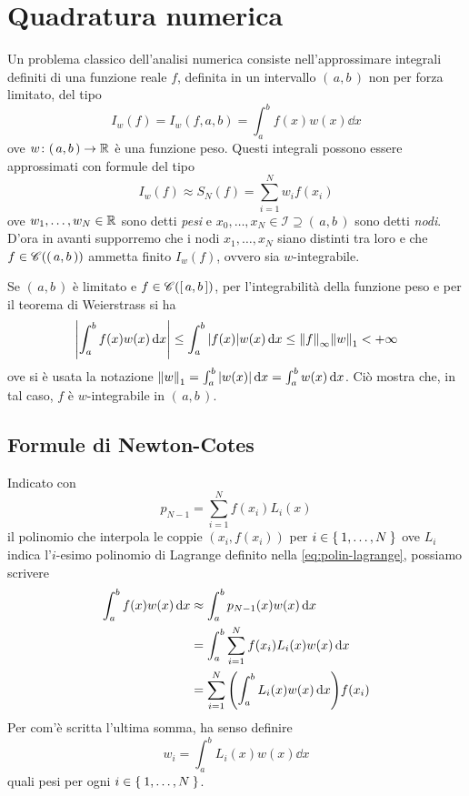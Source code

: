 \chapter{Quadratura numerica}

	\noindent Un problema classico dell'analisi numerica consiste nell'approssimare integrali definiti di una funzione reale \(f\), definita in un intervallo \((\, a, b \,)\) non per forza limitato, del tipo
	\begin{equation}\label{eq:integrale-con-peso}
		I_w (f) = I_w (f, a, b) = \int_a^b f (x) w (x) \dd{x}
	\end{equation}
	ove \(w \colon (\, a, b \,) \to \mathbb{R}\) è una funzione peso. Questi integrali possono essere approssimati con formule del tipo
	\begin{equation}\label{eq:formula-quadratura}
		I_w (f) \approx S_N (f) = \sum_{i = 1}^N w_i f (x_i)
	\end{equation}
	ove \(w_1, \dots, w_N \in \mathbb{R}\) sono detti \emph{pesi} e \(x_0, \dots, x_N \in \mathcal{I} \supseteq (\, a, b \,)\) sono detti \emph{nodi}. D'ora in avanti supporremo che i nodi \(x_1, \dots, x_N\) siano distinti tra loro e che \(f \in \mathscr{C} ((\, a, b \,))\) ammetta finito \(I_w (f)\), ovvero sia \(w\)-integrabile.
	
	Se \((\, a, b \,)\) è limitato e \(f \in \mathscr{C} ([\, a, b \,])\), per l'integrabilità della funzione peso e per il teorema di Weierstrass si ha
	\begin{equation*}
		\abs{\int_a^b f (x) w (x) \dd{x}} \le \int_a^b \abs{f (x)} w (x) \dd{x} \le \norm{f}_\infty \norm{w}_1 < + \infty
	\end{equation*}
	ove si è usata la notazione \(\norm{w}_1 = \int_a^b \abs{w (x)} \dd{x} = \int_a^b w (x) \dd{x}\). Ciò mostra che, in tal caso, \(f\) è \(w\)-integrabile in \((\, a, b \,)\).
	
\section{Formule di Newton-Cotes}
	
	\noindent Indicato con
	\begin{equation*}
		p_{N - 1} = \sum_{i = 1}^N f (x_i) L_i (x)
	\end{equation*}
	il polinomio che interpola le coppie \((x_i, f (x_i))\) per \(i \in \Set{1, \dots, N}\) ove \(L_i\) indica l'\(i\)-esimo polinomio di Lagrange definito nella \eqref{eq:polin-lagrange}, possiamo scrivere
	\begin{equation*}
		\begin{split}
			\int_a^b f (x) w (x) \dd{x} &\approx \int_a^b p_{N - 1} (x) w (x) \dd{x} \\
			&= \int_a^b \sum_{i = 1}^N f (x_i) L_i (x) w (x) \dd{x} \\
			&= \sum_{i = 1}^N \qty(\int_a^b L_i (x) w (x) \dd{x}) f (x_i)
		\end{split}
	\end{equation*}
	Per com'è scritta l'ultima somma, ha senso definire
	\begin{equation*}
		w_i = \int_a^b L_i (x) w (x) \dd{x}
	\end{equation*}
	quali pesi per ogni \(i \in \Set{1, \dots, N}\).
	
